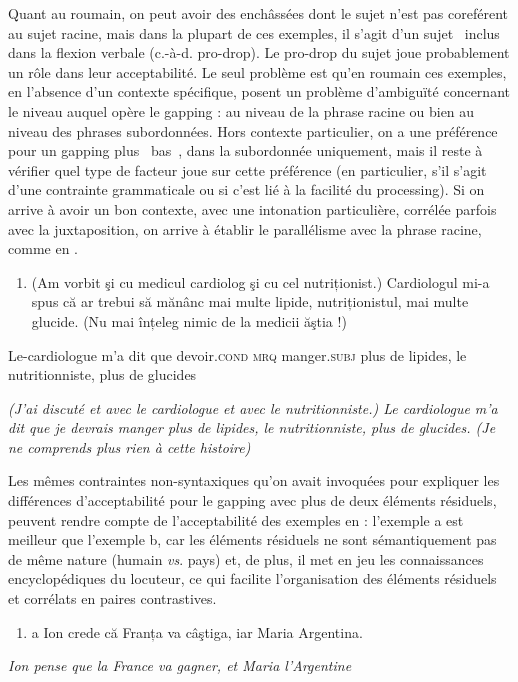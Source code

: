 Quant au roumain, on peut avoir des enchâssées dont le sujet n'est pas coreférent au sujet racine, mais dans la plupart de ces exemples, il s'agit d'un sujet {\guillemotleft}~inclus~{\guillemotright} dans la flexion verbale (c.-à-d. pro-drop). Le pro-drop du sujet joue probablement un rôle dans leur acceptabilité. Le seul problème est qu'en roumain ces exemples, en l'absence d'un contexte spécifique, posent un problème d'ambiguïté concernant le niveau auquel opère le gapping : au niveau de la phrase racine ou bien au niveau des phrases subordonnées. Hors contexte particulier, on a une préférence pour un gapping plus {\guillemotleft}~bas~{\guillemotright}, dans la subordonnée uniquement, mais il reste à vérifier quel type de facteur joue sur cette préférence (en particulier, s'il s'agit d'une contrainte grammaticale ou si c'est lié à la facilité du processing). Si on arrive à avoir un bon contexte, avec une intonation particulière, corrélée parfois avec la juxtaposition, on arrive à établir le parallélisme avec la phrase racine, comme en .


\begin{enumerate}
\item \label{bkm:Ref288752581}(Am vorbit şi cu medicul cardiolog şi cu cel nutriționist.) Cardiologul mi-a spus că ar trebui să mănânc mai multe lipide, nutriționistul, mai multe glucide. (Nu mai înțeleg nimic de la medicii ăştia !)


\end{enumerate}
Le-cardiologue m'a dit que devoir.\textsc{cond mrq} manger\textsc{.subj} plus de lipides, le nutritionniste, plus de glucides

{\itshape
(J'ai discuté et avec le cardiologue et avec le nutritionniste.) Le cardiologue m'a dit que je devrais manger plus de lipides, le nutritionniste, plus de glucides. (Je ne comprends plus rien à cette histoire)}

Les mêmes contraintes non-syntaxiques qu'on avait invoquées pour expliquer les différences d'acceptabilité pour le gapping avec plus de deux éléments résiduels, peuvent rendre compte de l'acceptabilité des exemples en  : l'exemple a est meilleur que l'exemple b, car les éléments résiduels ne sont sémantiquement pas de même nature (humain \textit{vs}. pays) et, de plus, il met en jeu les connaissances encyclopédiques du locuteur, ce qui facilite l'organisation des éléments résiduels et corrélats en paires contrastives.  


\begin{enumerate}
\item \label{bkm:Ref289364183}a  Ion crede că Franța va câştiga, iar Maria Argentina.


\end{enumerate}
{\itshape
Ion pense que la France va gagner, et Maria l'Argentine}


